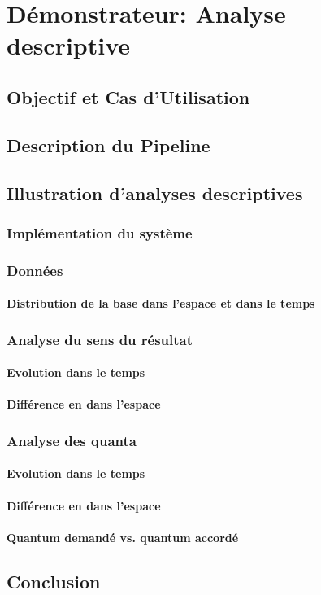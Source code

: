 \chapter{Démonstrateur: Analyse descriptive}
\label{chap:demo}

\section{Objectif et Cas d'Utilisation}
\label{sec:demo:objectif}

\section{Description du Pipeline}
\label{sec:demo:motivation}

\section{Illustration d'analyses descriptives}
\label{sec:demo:experimentations}

\subsection{Implémentation du système}

\subsection{Données}
\subsubsection{Distribution de la base dans l'espace et dans le temps}

\subsection{Analyse du sens du résultat}
\subsubsection{Evolution dans le temps}
\subsubsection{Différence en dans l'espace}

\subsection{Analyse des quanta}
\subsubsection{Evolution dans le temps}
\subsubsection{Différence en dans l'espace}
\subsubsection{Quantum demandé vs. quantum accordé}

\section{Conclusion}
\label{sec:demo:conclusion}